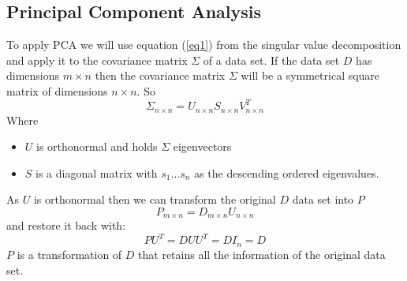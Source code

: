 \documentclass{article} %
\begin{document}
\subsection{Principal Component Analysis}
To apply PCA we will use equation (\ref{eq1}) from the singular value decomposition and apply it to the covariance matrix $\Sigma$ of a data set. If the data set $D$ has dimensions ${m\times n}$ then the covariance matrix $\Sigma$ will be a symmetrical square matrix of dimensions $n\times n$. So
\begin{equation}\label{eq2}
\Sigma_{n\times n} = U_{n\times n}S_{n\times n}V_{n\times n}^T
\end{equation}
Where
\begin{itemize}
\item $U$ is orthonormal and holds $\Sigma$ eigenvectors
\item $S$ is a diagonal matrix with $s_1 ... s_n$ as the descending ordered eigenvalues.
\end{itemize}
As $U$ is orthonormal then we can transform the original $D$ data set into $P$
\[ P_{m\times n} = D_{m\times n}U_{n\times n} \] and restore it back with:
\[P U^T = DUU^T = DI_{n} = D\]
$P$ is a transformation of $D$ that retains all the information of the original data set.
\end{document}
